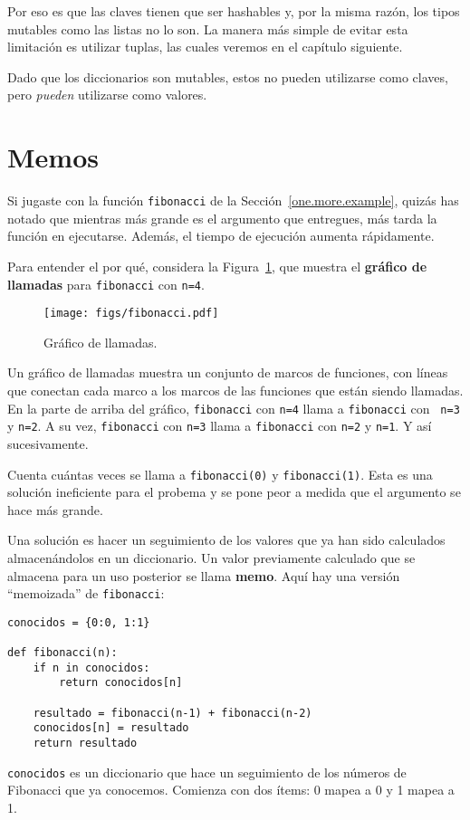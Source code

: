 \documentclass[10pt]{book}
\begin{document}
Por eso es que las claves tienen que ser hashables y, por la misma razón, los tipos mutables como
las listas no lo son.  La manera más simple de evitar esta limitación es
utilizar tuplas, las cuales veremos en el capítulo siguiente.

Dado que los diccionarios son mutables, estos no pueden utilizarse como claves,
pero {\em pueden} utilizarse como valores.


\section{Memos}
\label{memoize}

Si jugaste con la función {\tt fibonacci} de la
Sección~\ref{one.more.example}, quizás has notado que mientras más grande
es el argumento que entregues, más tarda la función en ejecutarse.
Además, el tiempo de ejecución aumenta rápidamente. 

Para entender el por qué, considera la Figura~\ref{fig.fibonacci}, que muestra
el {\bf gráfico de llamadas} para {\tt fibonacci} con {\tt n=4}.

\begin{figure}
\centerline
{\texttt{[image: figs/fibonacci.pdf]}}
\caption{Gráfico de llamadas.}
\label{fig.fibonacci}
\end{figure}

Un gráfico de llamadas muestra un conjunto de marcos de funciones, con líneas que conectan cada
marco a los marcos de las funciones que están siendo llamadas.  En la parte de arriba del
gráfico, {\tt fibonacci} con {\tt n=4} llama a {\tt fibonacci} con {\tt
n=3} y {\tt n=2}.  A su vez, {\tt fibonacci} con {\tt n=3} llama a
{\tt fibonacci} con {\tt n=2} y {\tt n=1}.  Y así sucesivamente.

Cuenta cuántas veces se llama a {\tt fibonacci(0)} y {\tt fibonacci(1)}.
Esta es una solución ineficiente para el probema y se pone peor
a medida que el argumento se hace más grande.


Una solución es hacer un seguimiento de los valores que ya han sido
calculados almacenándolos en un diccionario.   Un valor previamente calculado
que se almacena para un uso posterior se llama {\bf memo}.  Aquí hay una versión
``memoizada'' de {\tt fibonacci}:

\begin{verbatim}
conocidos = {0:0, 1:1}

def fibonacci(n):
    if n in conocidos:
        return conocidos[n]

    resultado = fibonacci(n-1) + fibonacci(n-2)
    conocidos[n] = resultado
    return resultado
\end{verbatim}
%
{\tt conocidos} es un diccionario que hace un seguimiento de los números de Fibonacci
que ya conocemos.  Comienza con
dos ítems: 0 mapea a 0 y 1 mapea a 1.
\end{document}
